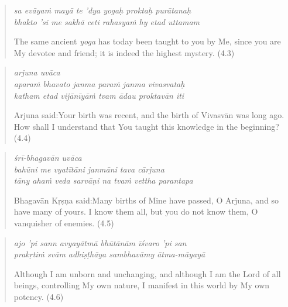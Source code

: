 \documentclass[12pt, twoside, openright]{memoir}
\begin{document}
\par
\begin{verse}
\textit{sa evāyaṁ mayā te ’dya yogaḥ proktaḥ purātanaḥ} \\
\textit{bhakto ’si me sakhā ceti rahasyaṁ hy etad uttamam}

\noindent The same ancient \textit{yoga} has today been taught to you by Me, since you are My devotee and friend; it is indeed the highest mystery. (4.3)
\end{verse}
\par



\par
\begin{verse}
\textit{arjuna uvāca} \\
\textit{aparaṁ bhavato janma paraṁ janma vivasvataḥ} \\
\textit{katham etad vijānīyāṁ tvam ādau proktavān iti}

\noindent \quad Arjuna said:\linebreak Your birth was recent, and the birth of Vivasvān was long ago. How shall I understand that You taught this knowledge in the beginning? (4.4)
\end{verse}
\par



\par
\begin{verse}
\textit{śrī-bhagavān uvāca} \\
\textit{bahūni me vyatītāni janmāni tava cārjuna} \\
\textit{tāny ahaṁ veda sarvāṇi na tvaṁ vettha parantapa}

\noindent \quad Bhagavān Kṛṣṇa said:\linebreak Many births of Mine have passed, O Arjuna, and so have many of yours. I know them all, but you do not know them, O vanquisher of enemies. (4.5)
\end{verse}
\par



\par
\begin{verse}
\textit{ajo ’pi sann avyayātmā bhūtānām īśvaro ’pi san} \\
\textit{prakṛtiṁ svām adhiṣṭhāya sambhavāmy ātma-māyayā}

\noindent Although I am unborn and unchanging, and although I am the Lord of all beings, controlling My own nature, I manifest in this world by My own potency. (4.6)
\end{verse}
\par
\end{document}
